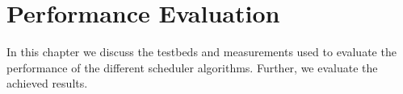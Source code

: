 \chapter{Performance Evaluation}
\label{ch:evaluation}


In this chapter we discuss the testbeds and measurements used to evaluate the performance of the different scheduler algorithms. 
Further, we evaluate the achieved results.
